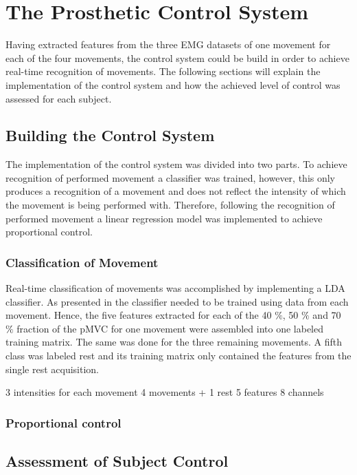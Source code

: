 
\section{The Prosthetic Control System}

Having extracted features from the three EMG datasets of one movement for each of the four movements, the control system could be build in order to achieve real-time recognition of movements. The following sections will explain the implementation of the control system and how the achieved level of control was assessed for each subject. 

\subsection{Building the Control System} 

The implementation of the control system was divided into two parts. To achieve recognition of performed movement a classifier was trained, however, this only produces a recognition of a movement and does not reflect the intensity of which the movement is being performed with. Therefore, following the recognition of performed movement a linear regression model was implemented to achieve proportional control. 

\subsubsection{Classification of Movement}

Real-time classification of movements was accomplished by implementing a LDA classifier. As presented in  the classifier needed to be trained using data from each movement. Hence, the five features extracted for each of the 40 $\percent$, 50 $\percent$ and 70 $\percent$ fraction of the pMVC for one movement were assembled into one labeled training matrix. The same was done for the three remaining movements. A fifth class was labeled rest and its training matrix only contained the features from the single rest acquisition.  

3 intensities for each movement 
4 movements + 1 rest 
5 features 
8 channels 

\subsubsection{Proportional control}  


\subsection{Assessment of Subject Control}

